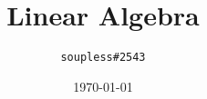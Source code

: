 \documentclass[twoside, 10pt]{article}
\title{Linear Algebra}
\author{\texttt{soupless\#2543}}
\date{\today}
\begin{document}
    \begin{titlepage}
        \maketitle
    \end{titlepage}

    \tableofcontents

    \newpage

    
    
    
\end{document}
